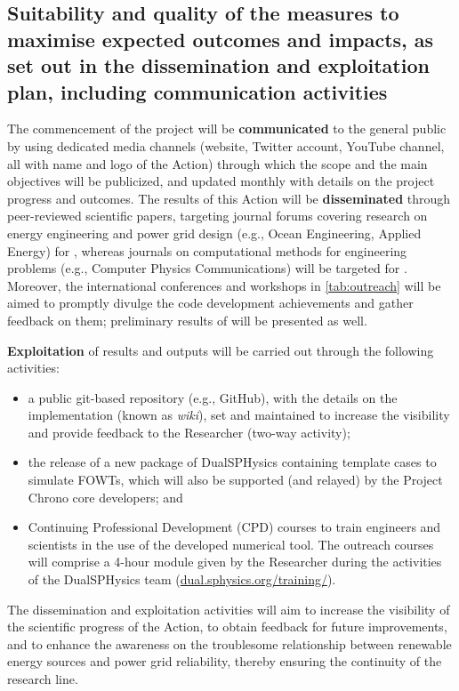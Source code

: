 \subsection{Suitability and quality of the measures to maximise expected outcomes and impacts, as set out in the dissemination and exploitation plan, including communication activities}
\vspace{-2ex}
{}

The commencement of the project will be \textbf{communicated} to the general public by using dedicated media channels (website, Twitter account, YouTube channel, all with name and logo of the Action) through which the scope and the main objectives will be publicized, and updated monthly with details on the project progress and outcomes. The results of this Action will be \textbf{disseminated} through peer-reviewed scientific papers, targeting journal forums covering research on energy engineering and power grid design (e.g., Ocean Engineering, Applied Energy) for , whereas journals on computational methods for engineering problems (e.g., Computer Physics Communications) will be targeted for . Moreover, the international conferences and workshops in \autoref{tab:outreach} will be aimed to promptly divulge the code development achievements and gather feedback on them; preliminary results of  will be presented as well.

\textbf{Exploitation} of results and outputs will be carried out through the following activities:
\begin{itemize}[noitemsep,topsep=1pt]
    \item a public git-based repository (e.g., GitHub), with the details on the implementation (known as \textit{wiki}), set and maintained to increase the visibility and provide feedback to the Researcher (two-way activity);
    \item the release of a new package of DualSPHysics containing template cases to simulate FOWTs, which will also be supported (and relayed) by the Project Chrono core developers; and
    \item Continuing Professional Development (CPD) courses to train engineers and scientists in the use of the developed numerical tool. The outreach courses will comprise a 4-hour module given by the Researcher during the activities of the DualSPHysics team (\href{https://dual.sphysics.org/training/}{dual.sphysics.org/training/}).
\end{itemize}
The dissemination and exploitation activities will aim to increase the visibility of the scientific progress of the Action, to obtain feedback for future improvements, and to enhance the awareness on the troublesome relationship between renewable energy sources and power grid reliability, thereby ensuring the continuity of the research line.\vspace{-2ex}

